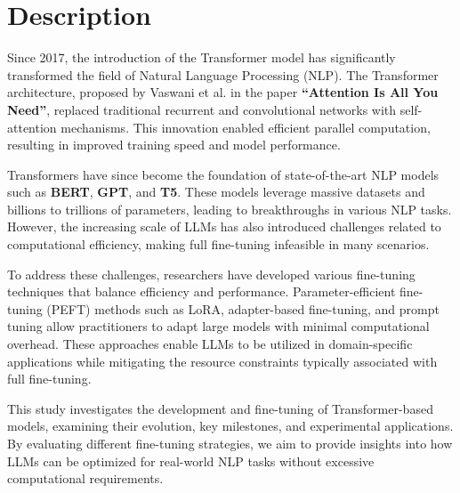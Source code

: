 \chapter{Description}

Since 2017, the introduction of the Transformer model has significantly transformed the field of Natural Language Processing (NLP). The Transformer architecture, proposed by Vaswani et al. in the paper \textbf{``Attention Is All You Need''}, replaced traditional recurrent and convolutional networks with self-attention mechanisms. This innovation enabled efficient parallel computation, resulting in improved training speed and model performance.

Transformers have since become the foundation of state-of-the-art NLP models such as \textbf{BERT}, \textbf{GPT}, and \textbf{T5}. These models leverage massive datasets and billions to trillions of parameters, leading to breakthroughs in various NLP tasks. However, the increasing scale of LLMs has also introduced challenges related to computational efficiency, making full fine-tuning infeasible in many scenarios.

To address these challenges, researchers have developed various fine-tuning techniques that balance efficiency and performance. Parameter-efficient fine-tuning (PEFT) methods such as LoRA, adapter-based fine-tuning, and prompt tuning allow practitioners to adapt large models with minimal computational overhead. These approaches enable LLMs to be utilized in domain-specific applications while mitigating the resource constraints typically associated with full fine-tuning.

This study investigates the development and fine-tuning of Transformer-based models, examining their evolution, key milestones, and experimental applications. By evaluating different fine-tuning strategies, we aim to provide insights into how LLMs can be optimized for real-world NLP tasks without excessive computational requirements.

\newpage